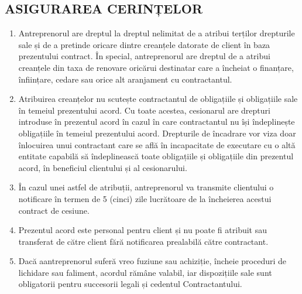 \begin{multicols}{2}
\subsection{ASIGURAREA CERINȚELOR}
\begin{enumerate}
\item Antreprenorul are dreptul la dreptul nelimitat de a atribui terților drepturile sale și de a pretinde oricare dintre creanțele datorate de client în baza prezentului contract. În special, antreprenorul are dreptul de a atribui creanțele din taxa de renovare oricărui destinatar care a încheiat o finanțare, înființare, cedare sau orice alt aranjament cu contractantul.
\item Atribuirea creanțelor nu scutește contractantul de obligațiile și obligațiile sale în temeiul prezentului acord. Cu toate acestea, cesionarul are drepturi introduse în prezentul acord în cazul în care contractantul nu își îndeplinește obligațiile în temeiul prezentului acord. Drepturile de încadrare vor viza doar înlocuirea unui contractant care se află în incapacitate de executare cu o altă entitate capabilă să îndeplinească toate obligațiile și obligațiile din prezentul acord, în beneficiul clientului și al cesionarului.
\item În cazul unei astfel de atribuții, antreprenorul va transmite clientului o notificare în termen de 5 (cinci) zile lucrătoare de la încheierea acestui contract de cesiune.
\item Prezentul acord este personal pentru client și nu poate fi atribuit sau transferat de către client fără notificarea prealabilă către contractant.
\item Dacă aantreprenorul suferă vreo fuziune sau achiziție, încheie proceduri de lichidare sau faliment, acordul rămâne valabil, iar dispozițiile sale sunt obligatorii pentru succesorii legali și cedentul Contractantului.
\end{enumerate}


\end{multicols}
